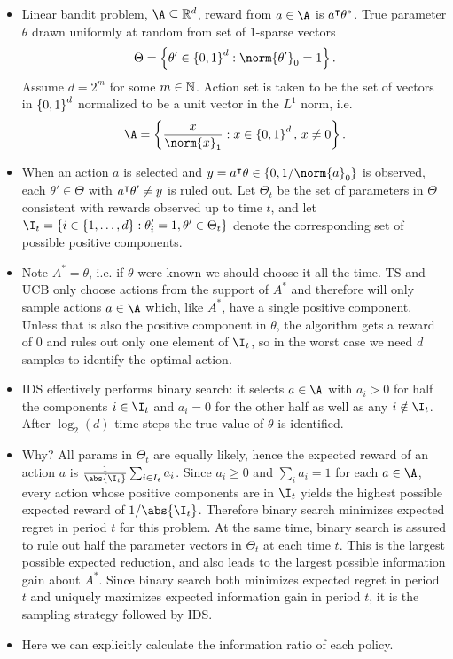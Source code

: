 \documentclass[11pt, openany]{book}
\begin{document}
\begin{example}
    \vspace*{-20pt}
    \begin{itemize}
        \item Linear bandit problem, $\A\subseteq\R^d$, reward from $a\in\A$ is $a^\intercal\theta^*$. True parameter $\theta$ drawn uniformly at random from set of $1$-sparse vectors
            \[
                \Theta = \set{\theta'\in\set{0,1}^d : \norm{\theta'}_0=1}.
            \]
            Assume $d=2^m$ for some $m\in\mathbb{N}$. Action set is taken to be the set of vectors in $\left\lbrace0,1\right\rbrace^d$ normalized to be a unit vector in the $L^1$ norm, i.e.
            \[
                \A = \set{ \frac{x}{\norm{x}_1} : x\in\set{0,1}^d, \, x\neq 0}. 
            \]
        \item When an action $a$ is selected and $y=a^\trans\theta\in\set{0,1/\norm{a}_0}$ is observed, each $\theta'\in\Theta$ with $a^\intercal\theta'\neq y$ is ruled out. Let $\Theta_t$ be the set of parameters in $\Theta$ consistent with rewards observed up to time $t$, and let $\I_t = \set{i\in\set{1,\dots,d} : \theta_i'=1,\theta'\in\Theta_t}$ denote the corresponding set of possible positive components.
        \item Note $A^* = \theta$, i.e. if $\theta$ were known we should choose it all the time. TS and UCB only choose actions from the support of $A^*$ and therefore will only sample actions $a\in\A$ which, like $A^*$, have a single positive component. Unless that is also the positive component in $\theta$, the algorithm gets a reward of $0$ and rules out only one element of $\I_t$, so in the worst case we need $d$ samples to identify the optimal action.
        \item IDS effectively performs binary search: it selects $a\in\A$ with $a_i>0$ for half the components $i\in \I_t$ and $a_i=0$ for the other half as well as any $i\notin \I_t$. After $\log_2(d)$ time steps the true value of $\theta$ is identified.
        \item Why? All params in $\Theta_t$ are equally likely, hence the expected reward of an action $a$ is $\frac{1}{\abs{\I_t}} \sum_{i\in I_t} a_i$. Since $a_i\geq 0$ and $\sum_i a_i = 1$ for each $a\in\A$, every action whose positive components are in $\I_t$ yields the highest possible expected reward of $1/\abs{\I_t}$. Therefore binary search minimizes expected regret in period $t$ for this problem. At the same time, binary search is assured to rule out half the parameter vectors in $\Theta_t$ at each time $t$. This is the largest possible expected reduction, and also leads to the largest possible information gain about $A^*$. Since binary search both minimizes expected regret in period $t$ and uniquely maximizes expected information gain in period $t$, it is the sampling strategy followed by IDS.
        \item Here we can explicitly calculate the information ratio of each policy.


\end{itemize}
\end{example}
\end{document}
